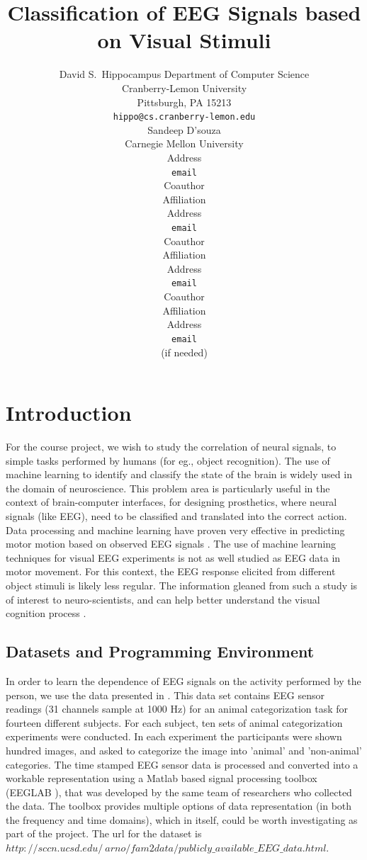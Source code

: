 \documentclass{article} %
\title{Classification of EEG Signals based on Visual Stimuli}
\author{
David S.~Hippocampus
Department of Computer Science\\
Cranberry-Lemon University\\
Pittsburgh, PA 15213 \\
\texttt{hippo@cs.cranberry-lemon.edu} \\
\And
Sandeep D'souza \\
Carnegie Mellon University \\
Address \\
\texttt{email} \\
\And
Coauthor \\
Affiliation \\
Address \\
\texttt{email} \\
\And
Coauthor \\
Affiliation \\
Address \\
\texttt{email} \\
\And
Coauthor \\
Affiliation \\
Address \\
\texttt{email} \\
(if needed)\\
}
\begin{document}
\newcommand{\quotes}[1]{``#1''}

\maketitle


\section{Introduction}

For the course project, we wish to study the correlation of neural signals, to simple tasks performed by humans (for eg., object recognition). The use of machine learning to identify and classify the state of the brain is widely used in the domain of neuroscience. This problem area is particularly useful in the context of brain-computer interfaces, for designing prosthetics, where neural signals (like EEG), need to be classified and translated into the correct action.  Data processing and machine learning have proven very effective in predicting motor motion based on observed EEG signals \cite{review}. The use of machine learning techniques for visual EEG experiments is not as well studied as EEG data in motor movement. For this context, the  EEG response elicited from different object stimuli is likely less regular. The information gleaned from such a study is of interest to neuro-scientists, and can help better understand the visual cognition process \cite{Stewart20141}.

\subsection{Datasets and Programming Environment}

In order to learn the dependence of EEG signals on the activity performed by the person, we use the data presented in \cite{eeglab}. This data set contains EEG sensor readings (31 channels sample at 1000 Hz) for an animal categorization task for fourteen different subjects. For each subject, ten sets of animal categorization experiments were conducted. In each experiment the participants were shown hundred images, and asked to categorize the image into 'animal' and 'non-animal' categories. The time stamped EEG sensor data is processed and converted into a workable representation using a Matlab based signal processing toolbox (EEGLAB \cite{eeglab}), that was developed by the same team of researchers who collected the data. The toolbox provides multiple options of data representation (in both the frequency and time domains), which in itself, could be worth investigating as part of the project. The url for the dataset is  $http://sccn.ucsd.edu/~arno/fam2data/publicly\_available\_EEG\_data.html$.
\end{document}
